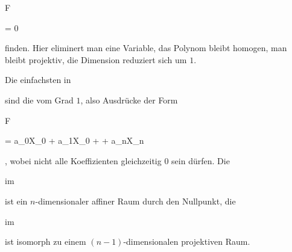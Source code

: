 \mavergleichskette

{\vergleichskette

{ F {  }
}

{ = }{ 0
}

{  }{
}

{    }{
}

{   }{
}

}
{}{}{}
finden. Hier eliminert man eine Variable, das Polynom bleibt homogen, man bleibt projektiv, die Dimension reduziert sich um $1$.



{


Die einfachsten
in

 sind die vom Grad $1$, also Ausdrücke der Form


\mavergleichskettedisp

{\vergleichskette

{F
}

{ =} { a_0X_0 + a_1X_0 + \cdots + a_nX_n
}

{ } {
}

{ } {
}

{ } {
}

}
{}{}{,}
wobei nicht alle Koeffizienten gleichzeitig $0$ sein dürfen. Die


 im

 ist ein $n$-dimensionaler affiner Raum durch den Nullpunkt, die


 im

 ist isomorph zu einem $(n-1)$-dimensionalen projektiven Raum.


}



{}

